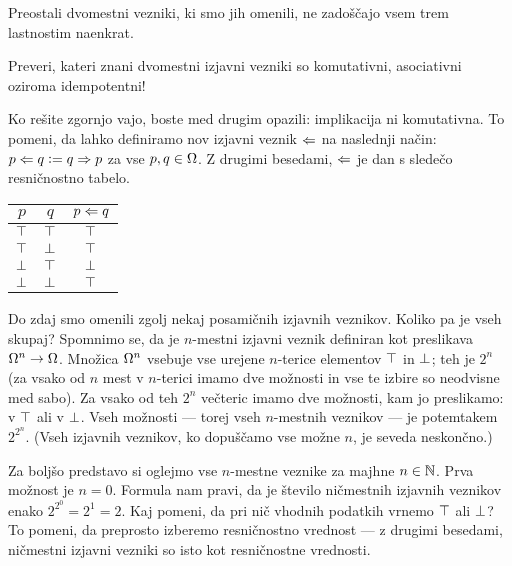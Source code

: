                 Preostali dvomestni vezniki, ki smo jih omenili, ne zadoščajo vsem trem lastnostim naenkrat.

                \begin{vaja}
                        Preveri, kateri znani dvomestni izjavni vezniki so komutativni, asociativni oziroma idempotentni!
                \end{vaja}

                Ko rešite zgornjo vajo, boste med drugim opazili: implikacija ni komutativna. To pomeni, da lahko definiramo nov izjavni veznik $\Leftarrow$ na naslednji način: $p \Leftarrow q \mathrel{\mathop:}= q \Rightarrow p$ za vse $p, q \in \Omega$. Z drugimi besedami, $\Leftarrow$ je dan s sledečo resničnostno tabelo.
                \begin{center}
                        \begin{tabular}{cc|c}
                                $p$ & $q$ & $p \Leftarrow q$ \\
                                \hline
                                $\top$ & $\top$ & $\top$ \\
                                $\top$ & $\bot$ & $\top$ \\
                                $\bot$ & $\top$ & $\bot$ \\
                                $\bot$ & $\bot$ & $\top$
                        \end{tabular}
                \end{center}


                Do zdaj smo omenili zgolj nekaj posamičnih izjavnih veznikov. Koliko pa je vseh skupaj? Spomnimo se, da je $n$-mestni izjavni veznik definiran kot preslikava $\Omega^n \to \Omega$. Množica $\Omega^n$ vsebuje vse urejene $n$-terice elementov $\top$ in $\bot$; teh je $2^n$ (za vsako od $n$ mest v $n$-terici imamo dve možnosti in vse te izbire so neodvisne med sabo). Za vsako od teh $2^n$ večteric imamo dve možnosti, kam jo preslikamo: v $\top$ ali v $\bot$. Vseh možnosti --- torej vseh $n$-mestnih veznikov --- je potemtakem $2^{2^n}$. (Vseh izjavnih veznikov, ko dopuščamo vse možne $n$, je seveda neskončno.)

                Za boljšo predstavo si oglejmo vse $n$-mestne veznike za majhne $n \in \mathbb{N}$. Prva možnost je $n = 0$. Formula nam pravi, da je število ničmestnih izjavnih veznikov enako $2^{2^0} = 2^1 = 2$. Kaj pomeni, da pri nič vhodnih podatkih vrnemo $\top$ ali $\bot$? To pomeni, da preprosto izberemo resničnostno vrednost --- z drugimi besedami, ničmestni izjavni vezniki so isto kot resničnostne vrednosti.

